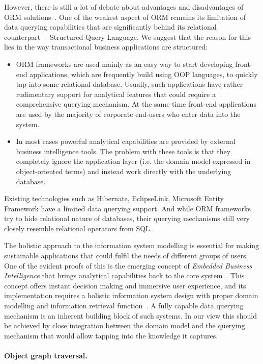   However, there is still a lot of debate about advantages and disadvantages of ORM solutions~\cite{Neward:2006:VCS, Fowler:2012:OH}.
  One of the weakest aspect of ORM remains its limitation of data querying capabilities that are significantly behind its relational counterpart~-- Structured Query Language.
  We suggest that the reason for this lies in the way transactional business applications are structured:
  \begin{itemize}
   \item ORM frameworks are used mainly as an easy way to start developing front-end applications, which are frequently build using OOP languages, to quickly tap into some relational database.
   Usually, such applications have rather rudimentary support for analytical features that could require a comprehensive querying mechanism. 
   At the same time front-end applications are used by the majority of corporate end-users who enter data into the system.
   \item In most cases powerful analytical capabilities are provided by external business intelligence tools.
   The problem with these tools is that they completely ignore the application layer (i.e. the domain model expressed in object-oriented terms) and instead work directly with the underlying database.
  \end{itemize}
  Existing technologies such as Hibernate, EclipseLink, Microsoft Entity Framework have a limited data querying support.
  And while ORM frameworks try to hide relational nature of databases, their querying mechanisms still very closely resemble relational operators from SQL.
  
  The holistic approach to the information system modelling is essential for making sustainable applications that could fulfil the needs of different groups of users.
  One of the evident proofs of this is the emerging concept of \emph{Embedded Business Intelligence} that brings analytical capabilities back to the core system~\cite{XLSHW2007}.
  This concept offers instant decision making and immersive user experience, and its implementation requires a holistic information system design with proper domain modelling and information retrieval function~\cite{oli2007}.
  A fully capable data querying mechanism is an inherent building block of such systems.
  In our view this should be achieved by close integration between the domain model and the querying mechanism that would allow tapping into the knowledge it captures.

\paragraph{Object graph traversal.}

